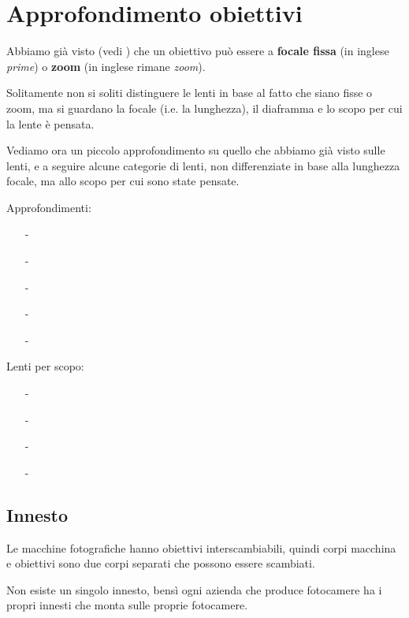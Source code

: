 \section{Approfondimento obiettivi} \label{sec:obiettivi_approfondimento}
Abbiamo già visto (vedi ) che un obiettivo può essere a \textbf{focale fissa} (in inglese \textit{prime}) o \textbf{zoom} (in inglese rimane \textit{zoom}).

Solitamente non si soliti distinguere le lenti in base al fatto che siano fisse o zoom, ma si guardano la focale (i.e. la lunghezza), il diaframma e lo scopo per cui la lente è pensata.

Vediamo ora un piccolo approfondimento su quello che abbiamo già visto sulle lenti, e a seguire alcune categorie di lenti, non differenziate in base alla lunghezza focale, ma allo scopo per cui sono state pensate.

Approfondimenti:
    \begin{itemize}
        \item[-] 
        \item[-] 
        \item[-] 
        \item[-] 
        \item[-]  
    \end{itemize}

Lenti per scopo:
    \begin{itemize}
        \item[-] 
        \item[-] 
        \item[-] 
        \item[-] 
    \end{itemize}


\subsection{Innesto} \label{subsec:innesto}
Le macchine fotografiche hanno obiettivi interscambiabili, quindi corpi macchina e obiettivi sono due corpi separati che possono essere scambiati.

Non esiste un singolo innesto, bensì ogni azienda che produce fotocamere ha i propri innesti che monta sulle proprie fotocamere.

